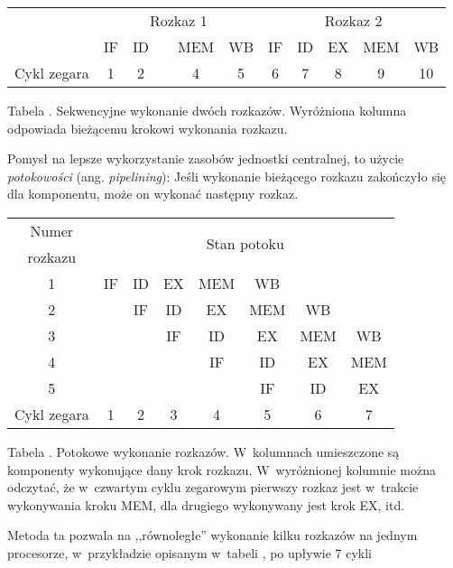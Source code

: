 \documentclass[12pt]{mwart}
\newcounter{tabmain}
\newcommand{\mytabcaption}[1]{ \begin{center}\parbox[t]{11.5cm}{\normalsize{Tabela \arabic{tabmain}. #1.}}\end{center} \addtocounter{tabmain}{1} }
\begin{document}
	\begin{center}
	\centering
	\begin{tabular}{|c|c|c|c|c|c|c|c|c|c|c|} \hline
	& \multicolumn{5}{c|}{Rozkaz 1} & \multicolumn{5}{c|}{Rozkaz 2}  \\
	\hhline{|~|*{10}-}& IF & ID & {\cellcolor{yellow}{EX}} & MEM & WB & IF & ID & EX & MEM & WB\\ \hline \hline
	Cykl zegara & 1 & 2 & {\cellcolor{yellow}{3}} & 4 & 5 & 6 & 7 & 8 & 9 & 10 \\ \hline
	\end{tabular}\par
	\mytabcaption{Sekwencyjne wykonanie dwóch rozkazów. Wyróżniona kolumna odpowiada bieżącemu krokowi wykonania
	rozkazu}
	\end{center}\par
\par
%
\indent 
	Pomysł na lepsze wykorzystanie zasobów jednostki centralnej, to użycie \emph{potokowości} (ang. \emph{pipelining}):
	Jeśli wykonanie bieżącego rozkazu zakończyło się dla komponentu, może on wykonać następny rozkaz.
	\begin{center}
	\centering
	\begin{tabular}{|c|c|c|c|c|c|c|c|} \hline
	Numer 		 & \multicolumn{7}{c|}{\multirow{2}{*}{Stan potoku}} \\
	rozkazu & \multicolumn{7}{c|}{} \\ \hline
	1 & IF & ID & EX & \cellcolor{yellow} MEM & WB & & \\ \hline
	2 & & IF & ID & \cellcolor{yellow} EX & MEM & WB & \\ \hline
	3 & & & IF & \cellcolor{yellow} ID & EX & MEM & WB \\ \hline
	4 & & & & \cellcolor{yellow} IF & ID & EX & MEM \\ \hline
	5 & & & & \cellcolor{yellow} & IF & ID & EX \\ \hline \hline
	Cykl zegara & 1 & 2 & 3 & \cellcolor{yellow} 4 & 5 & 6 & 7 \\ \hline
	\end{tabular}
   \setcounter{pipeline}{\value{tabmain}}
	\mytabcaption{Potokowe wykonanie rozkazów. W~kolumnach umieszczone są komponenty wykonujące dany krok rozkazu.
	W~wyróżnionej kolumnie można odczytać, że w~czwartym cyklu zegarowym pierwszy rozkaz jest w~trakcie wykonywania kroku MEM, 
	dla drugiego wykonywany jest krok EX, itd}
	\end{center}
	Metoda ta pozwala na ,,równoległe'' wykonanie kilku rozkazów na jednym procesorze, w~przykładzie opisanym w~tabeli , po upływie 7 cykli
\end{document}
